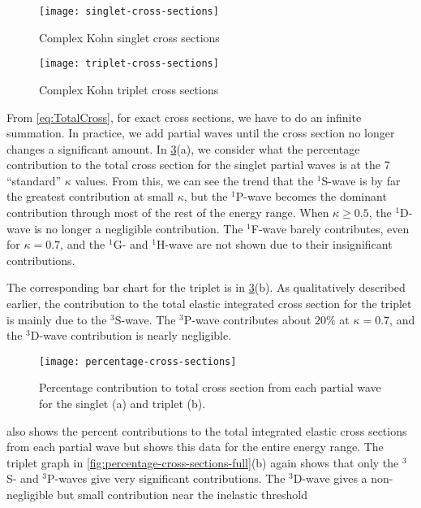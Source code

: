 \documentclass[Dissertation.tex]{subfiles}
\begin{document}
\begin{figure}
	\centering
	\texttt{[image: singlet-cross-sections]}
	\caption{Complex Kohn singlet cross sections}
	\label{fig:singlet-cross-sections}
\end{figure}

\begin{figure}
	\centering
	\texttt{[image: triplet-cross-sections]}
	\caption{Complex Kohn triplet cross sections}
	\label{fig:triplet-cross-sections}
\end{figure}

From \cref{eq:TotalCross}, for exact cross sections, we have to do an infinite
summation. In practice, we add partial waves until the cross section no longer
changes a significant amount. In \cref{fig:percentage-cross-sections}(a), we
consider what the percentage contribution to the total cross section for
the singlet partial waves is at the 7 ``standard'' $\kappa$ values. From this,
we can see the trend that the $^1$S-wave is by far the greatest contribution at
small $\kappa$, but the $^1$P-wave becomes the dominant contribution through
most of the rest of the energy range. When $\kappa \geq 0.5$, the $^1$D-wave is
no longer a negligible contribution. The $^1$F-wave barely contributes, even
for $\kappa = 0.7$, and the $^1$G- and $^1$H-wave are not shown due to their
insignificant contributions.

The corresponding bar chart for the triplet is in
\cref{fig:percentage-cross-sections}(b). As qualitatively described earlier,
the contribution to the total elastic integrated cross section for
the triplet is mainly due to the $^3$S-wave. The $^3$P-wave contributes about
$20\%$ at $\kappa = 0.7$, and the $^3$D-wave contribution is nearly negligible.

\begin{figure}
	\centering
	\texttt{[image: percentage-cross-sections]}
	\caption[Percentage contribution to total cross section]{Percentage contribution to total cross section from each partial wave for the singlet (a) and triplet (b).}
	\label{fig:percentage-cross-sections}
\end{figure}

 also shows the percent contributions to 
the total integrated elastic cross sections from each partial wave but shows
this data for the entire energy range. The triplet graph in
\cref{fig:percentage-cross-sections-full}(b) again shows that only the $^3$S- and
$^3$P-waves give very significant contributions. The $^3$D-wave gives a
non-negligible but small contribution near the inelastic threshold
\end{document}
